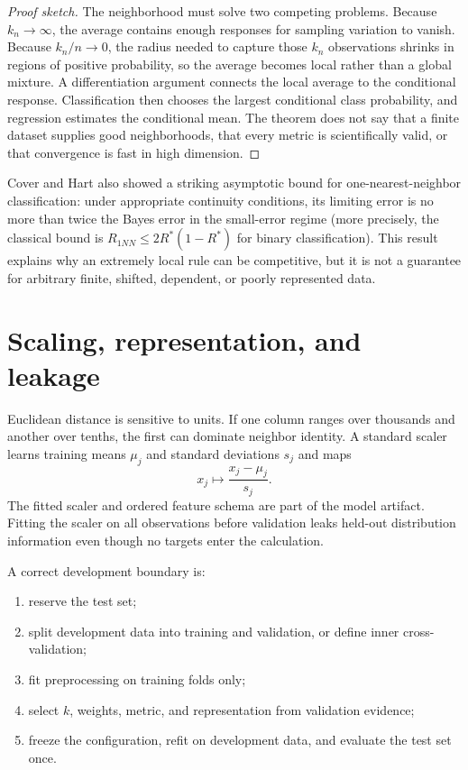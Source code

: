 \begin{proof}[Proof sketch]
The neighborhood must solve two competing problems. Because $k_n\to\infty$,
the average contains enough responses for sampling variation to vanish. Because
$k_n/n\to 0$, the radius needed to capture those $k_n$ observations shrinks in
regions of positive probability, so the average becomes local rather than a
global mixture. A differentiation argument connects the local average to the
conditional response. Classification then chooses the largest conditional
class probability, and regression estimates the conditional mean. The theorem
does not say that a finite dataset supplies good neighborhoods, that every
metric is scientifically valid, or that convergence is fast in high dimension.
\end{proof}

Cover and Hart also showed a striking asymptotic bound for one-nearest-neighbor
classification: under appropriate continuity conditions, its limiting error is
no more than twice the Bayes error in the small-error regime (more precisely,
the classical bound is $R_{1NN}\le 2R^*(1-R^*)$ for binary classification).
This result explains why an extremely local rule can be competitive, but it is
not a guarantee for arbitrary finite, shifted, dependent, or poorly represented
data.

\section{Scaling, representation, and leakage}

Euclidean distance is sensitive to units. If one column ranges over thousands
and another over tenths, the first can dominate neighbor identity. A standard
scaler learns training means $\mu_j$ and standard deviations $s_j$ and maps
\[
x_j\mapsto \frac{x_j-\mu_j}{s_j}.
\]
The fitted scaler and ordered feature schema are part of the model artifact.
Fitting the scaler on all observations before validation leaks held-out
distribution information even though no targets enter the calculation.

A correct development boundary is:
\begin{enumerate}
  \item reserve the test set;
  \item split development data into training and validation, or define inner
  cross-validation;
  \item fit preprocessing on training folds only;
  \item select $k$, weights, metric, and representation from validation
  evidence;
  \item freeze the configuration, refit on development data, and evaluate the
  test set once.
\end{enumerate}

